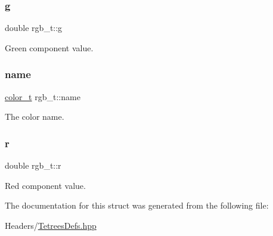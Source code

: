 \subsubsection{\texorpdfstring{g}{g}}
{\footnotesize\ttfamily double rgb\+\_\+t\+::g}

Green component value. \mbox{\label{structrgb__t_a98fbae1e6897105536340238b9660ba5}} 
\subsubsection{\texorpdfstring{name}{name}}
{\footnotesize\ttfamily \mbox{\hyperlink{TetreesDefs_8hpp_a8ba5fbce2446135735693ab60c896bbd}{color\+\_\+t}} rgb\+\_\+t\+::name}

The color name. \mbox{\label{structrgb__t_a89e46e1937cafe0683023100a5e1915a}} 
\subsubsection{\texorpdfstring{r}{r}}
{\footnotesize\ttfamily double rgb\+\_\+t\+::r}

Red component value. 

The documentation for this struct was generated from the following file\+:\begin{DoxyCompactItemize}
\item 
Headers/\mbox{\hyperlink{TetreesDefs_8hpp}{Tetrees\+Defs.\+hpp}}\end{DoxyCompactItemize}
